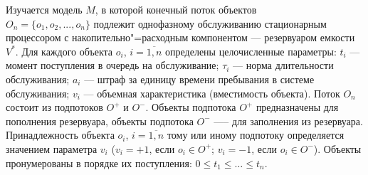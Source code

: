 \begin{ptkarticle}



Изучается модель $M$, в которой конечный поток объектов\\$O_n=\{o_1, o_2, ..., o_n\}$
подлежит однофазному обслуживанию стационарным процессором с накопительно"=расходным компонентом --- резервуаром емкости $V^*$. Для каждого объекта $o_i$, $i=\overline{1,n}$ определены целочисленные параметры: $t_i$ — момент поступления в очередь на обслуживание; $\tau_i$ — норма длительности обслуживания; $a_i$ — штраф за единицу времени пребывания в системе обслуживания; $v_i$ — объемная характеристика (вместимость объекта). Поток $O_n$ состоит из подпотоков $O^+$ и $O^-$. Объекты подпотока $O^+$ предназначены для пополнения резервуара, объекты подпотока $O^-$ —-- для заполнения из резервуара. Принадлежность объекта $o_i$, $i=\overline{1,n}$ тому или иному подпотоку определяется значением параметра $v_i$ ($v_i=+1$, если $o_i\in{O^+}$; $v_i=-1$, если $o_i\in{O^-}$). Объекты пронумерованы в порядке их поступления: $0\leq{t_1}\leq{…}\leq{t_n}$.


\end{ptkarticle}

